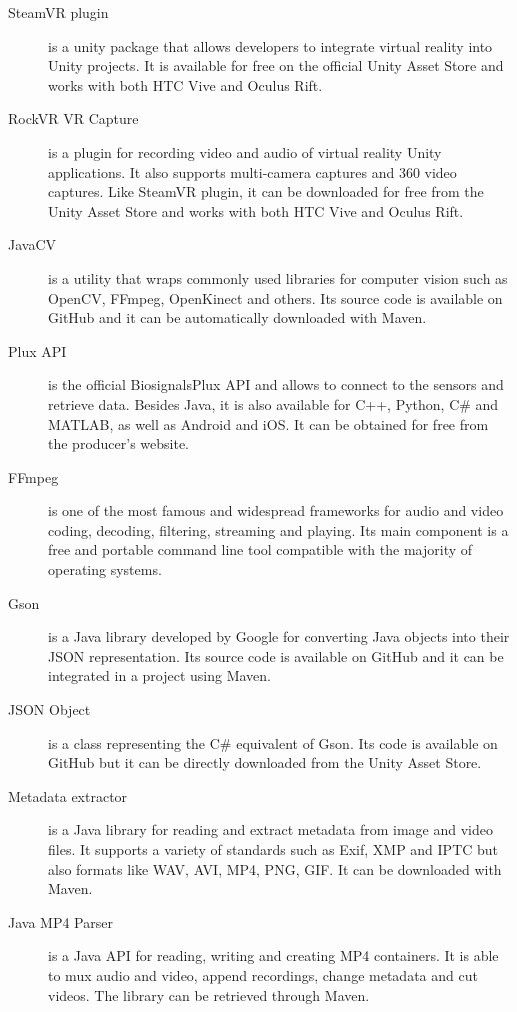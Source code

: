 \documentclass[binding=0.6cm,LaM]{sapthesis}
\begin{document}
\begin{description}

\item[SteamVR plugin] is a unity package that allows developers to integrate virtual reality into Unity projects. It is available for free on the official Unity Asset Store and works with both HTC Vive and Oculus Rift. 

\item[RockVR VR Capture] is a plugin for recording video and audio of virtual reality Unity applications. It also supports multi-camera captures and 360 video captures. Like SteamVR plugin, it can be downloaded for free from the Unity Asset Store and works with both HTC Vive and Oculus Rift.

\item[JavaCV] is a utility that wraps commonly used libraries for computer vision such as OpenCV, FFmpeg, OpenKinect and others. Its source code is available on GitHub and it can be automatically downloaded with Maven.

\item[Plux API] is the official BiosignalsPlux API and allows to connect to the sensors and retrieve data. Besides Java, it is also available for C++, Python, C\# and MATLAB, as well as Android and iOS. It can be obtained for free from the producer's website.

\item[FFmpeg] is one of the most famous and widespread frameworks for audio and video coding, decoding, filtering, streaming and playing. Its main component is a free and portable command line tool compatible with the majority of operating systems.

\item[Gson] is a Java library developed by Google for converting Java objects into their JSON representation. Its source code is available on GitHub and it can be integrated in a project using Maven.

\item[JSON Object] is a class representing the C\# equivalent of Gson. Its code is available on GitHub but it can be directly downloaded from the Unity Asset Store.

\item[Metadata extractor] is a Java library for reading and extract metadata from image and video files. It supports a variety of standards such as Exif, XMP and IPTC but also formats like WAV, AVI, MP4, PNG, GIF. It can be downloaded with Maven. 

\item[Java MP4 Parser] is a Java API for reading, writing and creating MP4 containers. It is able to mux audio and video, append recordings, change metadata and cut videos. The library can be retrieved through Maven.

\end{description}
\end{document}
